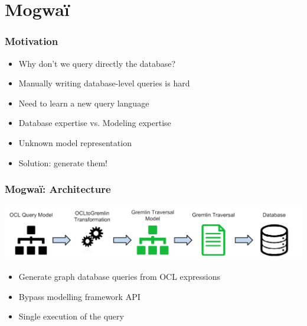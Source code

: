 \documentclass[10pt]{beamer}
\begin{document}
\section{Mogwa\"i}

\begin{frame}[c]\frametitle{Motivation}
	\begin{itemize}
		\item Why don't we query directly the database?
		\item Manually writing database-level queries is hard
		\item Need to learn a new query language
		\item Database expertise vs. Modeling expertise
		\item Unknown model representation
		\item Solution: generate them!
	\end{itemize}
	
\end{frame}

\begin{frame}[t]\frametitle{Mogwa\"i: Architecture~\cite{DBLP:conf/rcis/DanielSC16}}
    \begin{center}
      \includegraphics[width=\textwidth]{mogwai-architecture.png}
    \end{center}
	\begin{itemize}
		\item Generate graph database queries from OCL expressions
		\item Bypass modelling framework API
		\item Single execution of the query
	\end{itemize}
	
\end{frame}
\end{document}
